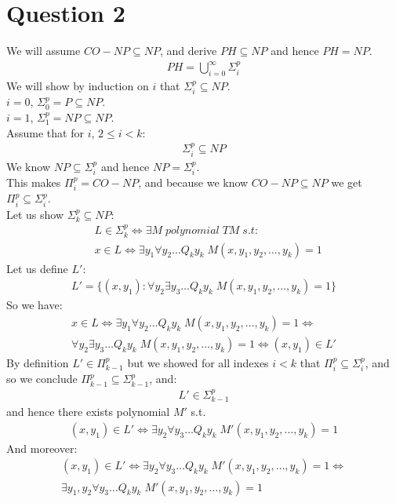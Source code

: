 \documentclass[11pt]{article}
\theoremstyle{plain}
\theoremstyle{nonumberplainnobrackets}
\begin{document}
\section*{Question 2}
We will assume $CO-NP\subseteq NP$, and derive $PH\subseteq NP$ and hence $PH=NP$.\\
\begin{align*}
PH = \bigcup_{i=0}^\infty \Sigma_i^p
\end{align*}
We will show by induction on $i$ that $\Sigma_i^p\subseteq NP$.\\
$i=0$,  $\Sigma_0^p= P\subseteq NP$.\\
$i=1$,  $\Sigma_1^p= NP\subseteq NP$.\\
Assume that for $i$, $2\le i<k$: 
\begin{align*}
\Sigma_i^p\subseteq NP
\end{align*}
We know $NP\subseteq \Sigma_i^p$ and hence $NP=\Sigma_i^p$.\\
This makes $\Pi_i^p = CO-NP$, and because we know $CO-NP\subseteq NP$ we get $\Pi_i^p \subseteq \Sigma_i^p$.
\\
Let us show $\Sigma_k^p\subseteq NP$:
\begin{align*}
	&L \in \Sigma_k^p \iff \exists M\;polynomial\;TM\;s.t:\;\\
	&x\in L \iff \exists y_1\forall y_2 \ldots Q_ky_k \;M(x,y_1,y_2,\ldots,y_k) = 1
\end{align*}
Let us define $L'$:
\begin{align*}
L'= \{ (x,y_1) :\forall y_2 \exists y_3 \ldots Q_ky_k \;M(x,y_1,y_2,\ldots,y_k) =1\}
\end{align*}
So we have:
\begin{align}\label{LL'}
x\in L \iff \exists y_1\forall y_2 \ldots Q_ky_k \;M(x,y_1,y_2,\ldots,y_k) = 1 \iff\\
\forall y_2 \exists y_3 \ldots Q_ky_k \;M(x,y_1,y_2,\ldots,y_k) =1 \iff 
(x,y_1)\in L'
\end{align}
By definition $L'\in \Pi_{k-1}^p$ but we showed for all indexes $i<k$ that $\Pi_i^p \subseteq \Sigma_i^p$, and so we conclude $\Pi_{k-1}^p \subseteq  \Sigma_{k-1}^p$, and:
\begin{align*}
L'\in \Sigma_{k-1}^p
\end{align*}
and hence there exists polynomial $M'$ s.t. 
\begin{align*}
(x,y_1) \in L' \iff \exists y_2  \forall  y_3\ldots Q_ky_k \;M'(x,y_1,y_2,\ldots,y_k) =1
\end{align*}
And moreover:
\begin{align*}
(x,y_1) \in L' \iff \exists y_2  \forall y_3\ldots Q_ky_k \;M'(x,y_1,y_2,\ldots,y_k) =1 \iff \\
\exists y_1,y_2  \forall y_3\ldots Q_ky_k \;M'(x,y_1,y_2,\ldots,y_k) =1 
\end{align*}
\end{document}
